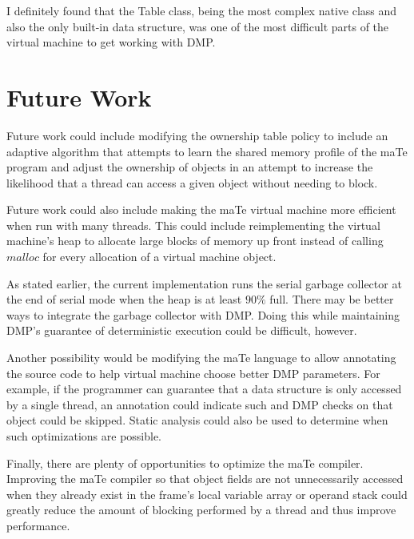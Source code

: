 I definitely found that the Table class, being the most complex native
class and also the only built-in data structure, was one of the most
difficult parts of the virtual machine to get working with DMP.

\section{Future Work}

Future work could include modifying the ownership table policy to
include an adaptive algorithm that attempts to learn the shared memory
profile of the maTe program and adjust the ownership of objects in an
attempt to increase the likelihood that a thread can access a given
object without needing to block.

Future work could also include making the maTe virtual machine more
efficient when run with many threads.  This could include
reimplementing the virtual machine's heap to allocate large blocks of
memory up front instead of calling $malloc$ for every allocation of a
virtual machine object.

As stated earlier, the current implementation runs the serial garbage
collector at the end of serial mode when the heap is at least $90\%$
full.  There may be better ways to integrate the garbage collector
with DMP.  Doing this while maintaining DMP's guarantee of
deterministic execution could be difficult, however.

Another possibility would be modifying the maTe language to allow
annotating the source code to help virtual machine choose better DMP
parameters.  For example, if the programmer can guarantee that a data
structure is only accessed by a single thread, an annotation could
indicate such and DMP checks on that object could be skipped.  Static
analysis could also be used to determine when such optimizations are
possible.

Finally, there are plenty of opportunities to optimize the maTe
compiler.  Improving the maTe compiler so that object fields are not
unnecessarily accessed when they already exist in the frame's local
variable array or operand stack could greatly reduce the amount of
blocking performed by a thread and thus improve performance.

